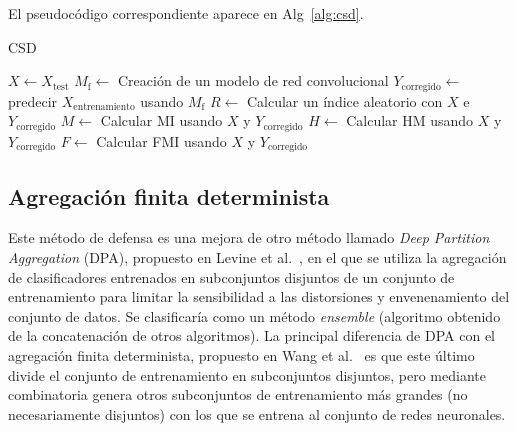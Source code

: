 El pseudocódigo correspondiente aparece en  Alg~\ref{alg:csd}.

\begin{algorithm}
\caption{CSD}\label{alg:csd}
\BlankLine
$X \leftarrow X_{\text{test}}$\;
$M_{\text{f}} \leftarrow$ Creación de un modelo de red convolucional\;
$Y_{\text{corregido}} \leftarrow$ predecir $X_{\text{entrenamiento}}$ usando $M_{\text{f}}$\;
$R \leftarrow$ Calcular un índice aleatorio con $X$ e $Y_{\text{corregido}}$\;
$M \leftarrow$ Calcular MI usando $X$ y $Y_{\text{corregido}}$\;
$H \leftarrow$ Calcular HM usando $X$ y $Y_{\text{corregido}}$\;
$F \leftarrow$ Calcular FMI usando $X$ y $Y_{\text{corregido}}$\;
\end{algorithm}


\subsection*{Agregación finita determinista}

Este método de defensa es una mejora de otro método llamado \textit{Deep Partition Aggregation} (DPA), propuesto en Levine et al.~\cite{DPA}, en el que se utiliza la agregación de clasificadores entrenados en subconjuntos disjuntos de un conjunto de entrenamiento para limitar la sensibilidad a las distorsiones y envenenamiento del conjunto de datos. Se clasificaría como un método \textit{ensemble} (algoritmo obtenido de la concatenación de otros algoritmos). La principal diferencia de DPA con el agregación finita determinista, propuesto en Wang et al.~\cite{AgregFinita} es que este último divide el conjunto de entrenamiento en subconjuntos disjuntos, pero mediante combinatoria genera otros subconjuntos de entrenamiento más grandes (no necesariamente disjuntos) con los que se entrena al conjunto de redes neuronales.

